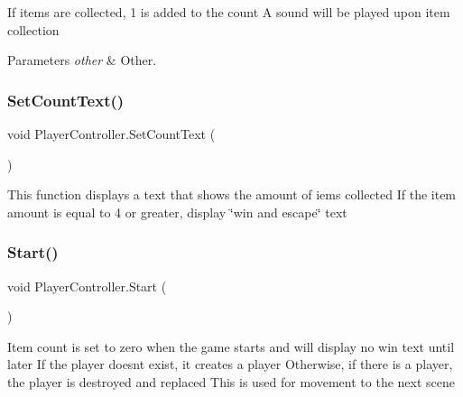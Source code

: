 If items are collected, 1 is added to the count A sound will be played upon item collection 


\begin{DoxyParams}{Parameters}
{\em other} & Other.\\
\hline
\end{DoxyParams}
\mbox{\label{class_player_controller_ad55b05bf5e6a5ae39a2a01700f1772ce}} 
\subsubsection{\texorpdfstring{Set\+Count\+Text()}{SetCountText()}}
{\footnotesize\ttfamily void Player\+Controller.\+Set\+Count\+Text (\begin{DoxyParamCaption}{ }\end{DoxyParamCaption})\hspace{0.3cm}{\ttfamily [private]}}



This function displays a text that shows the amount of iems collected If the item amount is equal to 4 or greater, display \char`\"{}win and escape\char`\"{} text 

\mbox{\label{class_player_controller_ae1117d9c4da3193181cddad2c814e467}} 
\subsubsection{\texorpdfstring{Start()}{Start()}}
{\footnotesize\ttfamily void Player\+Controller.\+Start (\begin{DoxyParamCaption}{ }\end{DoxyParamCaption})\hspace{0.3cm}{\ttfamily [private]}}



Item count is set to zero when the game starts and will display no win text until later If the player doesn\textquotesingle{}t exist, it creates a player Otherwise, if there is a player, the player is destroyed and replaced This is used for movement to the next scene 

\mbox{\label{class_player_controller_ae8bc83dffb99867a04be016473ed2c43}} 
